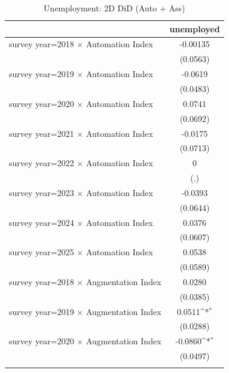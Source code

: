 \begin{table}[htbp]\centering
\def\sym#1{\ifmmode^{#1}\else\(^{#1}\)\fi}
\caption{Unemployment: 2D DiD (Auto + Ass)}
\begin{tabular}{l*{1}{c}}
\toprule
                    &\multicolumn{1}{c}{unemployed}\\
\midrule
survey year=2018 $\times$ Automation Index&    -0.00135         \\
                    &    (0.0563)         \\
\addlinespace
survey year=2019 $\times$ Automation Index&     -0.0619         \\
                    &    (0.0483)         \\
\addlinespace
survey year=2020 $\times$ Automation Index&      0.0741         \\
                    &    (0.0692)         \\
\addlinespace
survey year=2021 $\times$ Automation Index&     -0.0175         \\
                    &    (0.0713)         \\
\addlinespace
survey year=2022 $\times$ Automation Index&           0         \\
                    &         (.)         \\
\addlinespace
survey year=2023 $\times$ Automation Index&     -0.0393         \\
                    &    (0.0644)         \\
\addlinespace
survey year=2024 $\times$ Automation Index&      0.0376         \\
                    &    (0.0607)         \\
\addlinespace
survey year=2025 $\times$ Automation Index&      0.0538         \\
                    &    (0.0589)         \\
\addlinespace
survey year=2018 $\times$ Augmentation Index&      0.0280         \\
                    &    (0.0385)         \\
\addlinespace
survey year=2019 $\times$ Augmentation Index&      0.0511\sym{*}  \\
                    &    (0.0288)         \\
\addlinespace
survey year=2020 $\times$ Augmentation Index&     -0.0860\sym{*}  \\
                    &    (0.0497)         \\
\addlinespace

\end{tabular}
\end{table}
